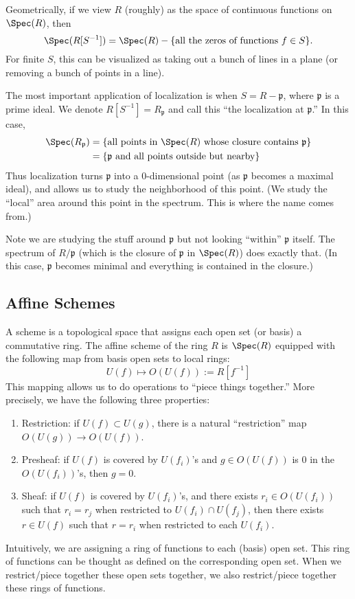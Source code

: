 Geometrically, if we view $R$ (roughly) as the space of continuous functions on $\Spec(R)$, then
\[
    \Spec(R[S^{-1}]) = \Spec(R) - \{ \text{all the zeros of functions } f \in S \}.
\]
For finite $S$, this can be visualized as taking out a bunch of lines in a plane (or removing a bunch of points in a line).

The most important application of localization is when $S = R - \mathfrak p$, where $\mathfrak p$ is a prime ideal. We denote $R[S^{-1}] = R_{\mathfrak p}$ and call this ``the localization at $\mathfrak p$.'' In this case,
\[
    \begin{split}
        \Spec(R_{\mathfrak p}) & = \{\text{all points in $\Spec(R)$ whose closure contains } \mathfrak p\} \\
                               & = \{\text{$\mathfrak p$ and all points outside but nearby}\}
    \end{split}
\]
Thus localization turns $\mathfrak p$ into a 0-dimensional point (as $\mathfrak p$ becomes a maximal ideal), and allows us to study the neighborhood of this point. (We study the ``local'' area around this point in the spectrum. This is where the name comes from.)

Note we are studying the stuff around $\mathfrak p$ but not looking ``within'' $\mathfrak p$ itself. The spectrum of $R/\mathfrak p$ (which is the closure of $\mathfrak p$ in $\Spec(R)$) does exactly that. (In this case, $\mathfrak p$ becomes minimal and everything is contained in the closure.)

\subsection{Affine Schemes}
A scheme is a topological space that assigns each open set (or basis) a commutative ring. The affine scheme of the ring $R$ is $\Spec(R)$ equipped with the following map from basis open sets to local rings:
\[
    U(f) \mapsto O(U(f)) := R[f^{-1}]
\]
This mapping allows us to do operations to ``piece things together.'' More precisely, we have the following three properties:
\begin{enumerate}
    \item Restriction: if $U(f) \subset U(g)$, there is a natural ``restriction'' map $O(U(g)) \to O(U(f))$.
    \item Presheaf: if $U(f)$ is covered by $U(f_i)$'s and $g \in O(U(f))$ is 0 in the $O(U(f_i))$'s, then $g = 0$.
    \item Sheaf: if $U(f)$ is covered by $U(f_i)$'s, and there exists $r_i \in O(U(f_i))$ such that $r_i = r_j$ when restricted to $U(f_i) \cap U(f_j)$, then there exists $r \in U(f)$ such that $r = r_i$ when restricted to each $U(f_i)$.
\end{enumerate}
Intuitively, we are assigning a ring of functions to each (basis) open set. This ring of functions can be thought as defined on the corresponding open set. When we restrict/piece together these open sets together, we also restrict/piece together these rings of functions.



